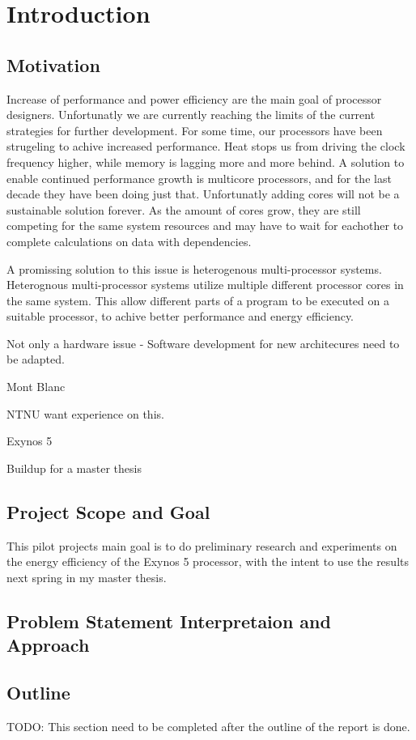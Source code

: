 \chapter[Introduction]{Introduction}
\section{Motivation}
Increase of performance and power efficiency are the main goal of processor designers.
Unfortunatly we are currently reaching the limits of the current strategies for further development.
For some time, our processors have been strugeling to achive increased performance.
Heat stops us from driving the clock frequency higher, while memory is lagging more and more behind.
A solution to enable continued performance growth is multicore processors, and for the last decade they have been doing just that.
Unfortunatly adding cores will not be a sustainable solution forever.
As the amount of cores grow, they are still competing for the same system resources and may have to wait for eachother to complete calculations on data with dependencies.

A promissing solution to this issue is heterogenous multi-processor systems.
Heterognous multi-processor systems utilize multiple different processor cores in the same system.
This allow different parts of a program to be executed on a suitable processor, to achive better performance and energy efficiency.


Not only a hardware issue - Software development for new architecures need to be adapted.

Mont Blanc 

NTNU want experience on this.

Exynos 5

Buildup for a master thesis

\section{Project Scope and Goal}
This pilot projects main goal is to do preliminary research and experiments on the energy efficiency of the Exynos 5 processor, with the intent to use the results next spring in my master thesis.




\section{Problem Statement Interpretaion and Approach}
\section{Outline}
TODO: This section need to be completed after the outline of the report is done.
